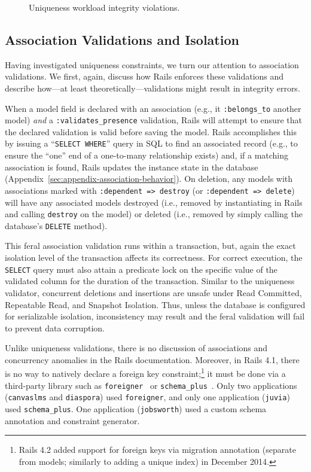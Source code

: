 \begin{figure}
\begin{minipage}{\columnwidth}
\end{minipage}
\caption{Uniqueness workload integrity violations.}\vspace{-.5em}
\label{fig:pk-workload}
\end{figure}

\subsection{Association Validations and Isolation}

Having investigated uniqueness constraints, we turn our attention to
association validations. We first, again, discuss how Rails enforces
these validations and describe how---at least
theoretically---validations might result in integrity errors.

When a model field is declared with an association (e.g., it
\texttt{:belongs\_to} another model) \textit{and} a
\texttt{:validates\_presence} validation, Rails will attempt to ensure
that the declared validation is valid before saving the model. Rails
accomplishes this by issuing a ``\texttt{SELECT WHERE}'' query in SQL
to find an associated record (e.g., to ensure the ``one'' end of a
one-to-many relationship exists) and, if a matching association is
found, Rails updates the instance state in the database
(Appendix~\ref{sec:appendix-association-behavior}). On deletion, any
models with associations marked with \texttt{:dependent => destroy}
(or \texttt{:dependent => delete}) will have any associated models
destroyed (i.e., removed by instantiating in Rails and calling
\texttt{destroy} on the model) or deleted (i.e., removed by simply
calling the database's \texttt{DELETE} method).

This feral association validation runs within a transaction, but,
again the exact isolation level of the transaction affects its
correctness. For correct execution, the \texttt{SELECT} query must
also attain a predicate lock on the specific value of the validated
column for the duration of the transaction. Similar to the uniqueness
validator, concurrent deletions and insertions are unsafe under Read
Committed, Repeatable Read, and Snapshot Isolation. Thus, unless the
database is configured for serializable isolation, inconsistency may
result and the feral validation will fail to prevent data corruption.

Unlike uniqueness validations, there is no discussion of associations
and concurrency anomalies in the Rails documentation. Moreover, in
Rails 4.1, there is no way to natively declare a foreign key
constraint;\footnote{Rails 4.2 added support for foreign keys via
  migration annotation (separate from models; similarly to adding a
  unique index) in December 2014.} it must be done via a third-party
library such as \texttt{foreigner}~\cite{foreigner} or
\texttt{schema\_plus}~\cite{schemaplus}. Only two applications
(\texttt{canvaslms} and \texttt{diaspora}) used \texttt{foreigner},
and only one application (\texttt{juvia}) used
\texttt{schema\_plus}. One application (\texttt{jobsworth}) used a
custom schema annotation and constraint generator.

